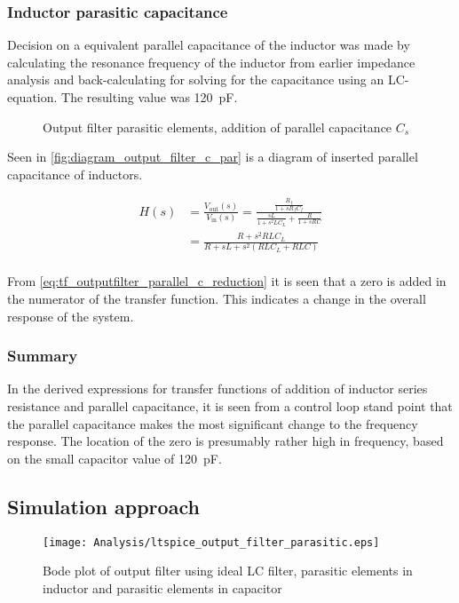 \subsubsection{Inductor parasitic capacitance}
Decision on a equivalent parallel capacitance of the inductor was made by calculating the resonance frequency of the inductor from earlier impedance analysis and back-calculating for solving for the capacitance using an LC-equation. The resulting value was \SI{120}{\pico\farad}.
\begin{figure}[H]
	\centering
	\begin{circuitikz}
		
	\end{circuitikz}
	\caption{Output filter parasitic elements, addition of parallel capacitance $C_{s}$}
	\label{fig:diagram_output_filter_c_par}
\end{figure}
Seen in \autoref{fig:diagram_output_filter_c_par} is a diagram of inserted parallel capacitance of inductors.

\begin{equation} \label{eq:tf_outputfilter_parallel_c_reduction}
	\begin{split}
		H(s) &= \frac{V_{\mathrm{out}}(s)}{V_{\mathrm{in}}(s)} = \frac{\frac{R_{f}}{1 + sR_{f}C_{f}}}{\frac{sL}{1+s^{2}LC_{L}} + \frac{R}{1 + sRC}} \\
		&= \frac{R + s^{2} RLC_{L}}{R + sL + s^{2} (RLC_{L} + RLC)} \\
	\end{split}
\end{equation}

From \autoref{eq:tf_outputfilter_parallel_c_reduction} it is seen that a zero is added in the numerator of the transfer function. This indicates a change in the overall response of the system.

\subsubsection{Summary}
In the derived expressions for transfer functions of addition of inductor series resistance and parallel capacitance, it is seen from a control loop stand point that the parallel capacitance makes the most significant change to the frequency response. The location of the zero is presumably rather high in frequency, based on the small capacitor value of \SI{120}{\pico\farad}.

\subsection{Simulation approach}
\begin{figure}[htbp]
	\centering
	\texttt{[image: Analysis/ltspice\_output\_filter\_parasitic.eps]}
	\caption{Bode plot of output filter using ideal LC filter, parasitic elements in inductor and parasitic elements in capacitor}
	\label{fig:ltspice_output_filter_l_parasitic}
\end{figure}

